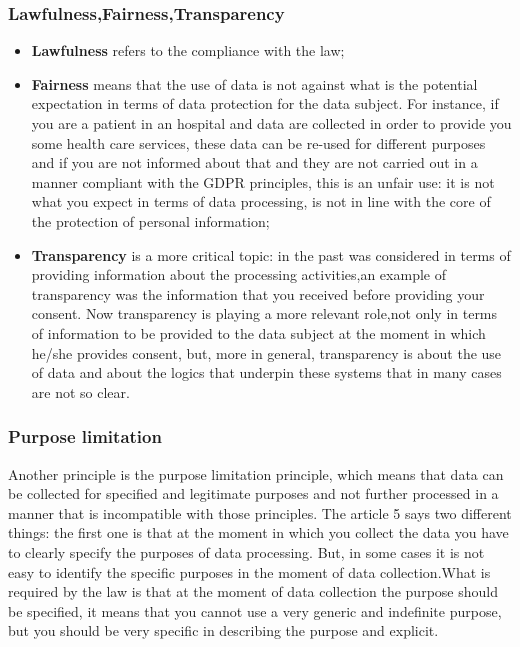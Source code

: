 \subsubsection{Lawfulness,Fairness,Transparency}
\begin{itemize}
    \item \textbf{Lawfulness} refers to the compliance with the law; 
    \item \textbf{Fairness} means that the use of data is not against what is the potential expectation in 
    terms of data protection for the data subject. For instance, if you are a patient in an hospital and data are collected in order to provide you some health care services, these data can be re-used for different purposes and if you are not informed about that and they are not carried out in a manner compliant with the GDPR principles, this is an unfair use: it is not what you expect in terms of data processing, is not in line with the core of the protection of personal information;
    \item \textbf{Transparency} is a more critical topic: in the past was considered in terms of providing information about the processing activities,an example of transparency was the information that you received before providing your consent. Now transparency is playing a more relevant role,not only in terms of information to be provided to the data subject at the moment in which he/she provides consent, but, more in general, transparency is about the use of data and about the logics that underpin these systems that in many cases are not so clear.
\end{itemize}

\subsubsection{Purpose limitation}
Another principle is the purpose limitation principle, which means that data can be collected for specified and legitimate purposes and not further processed in a manner that is incompatible with those principles. The article 5 says two different things: the first one is that at the moment in which you collect the data you have to clearly specify the purposes of data processing. But, in some cases it is not easy to identify the specific purposes in the moment of data collection.What is required by the law is that at the moment of data collection the purpose should be specified, it means that you cannot use a very generic and indefinite purpose, but you should be very specific in describing the purpose and explicit.\\


